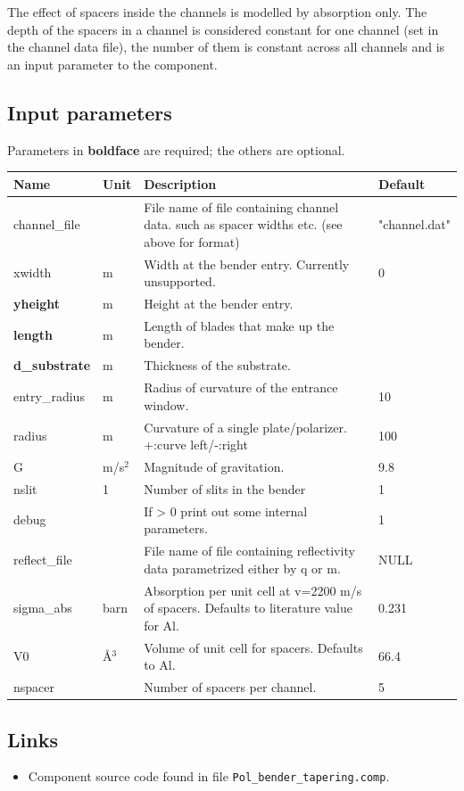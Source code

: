 The effect of spacers inside the channels is modelled by absorption only. The depth of the spacers in a channel is considered constant for one channel (set in the channel data file), the number of them is constant across all channels and is an input parameter to the component.

\subsection*{Input parameters}
Parameters in \textbf{boldface} are required; the others are optional.

\begin{longtable}{p{}p{}p{}p{}}
\toprule
\textbf{Name} & \textbf{Unit} & \textbf{Description} & \textbf{Default} \\
\midrule
\endhead
channel\_file &   & File name of file containing channel data. such as spacer widths etc. (see above for format) & "channel.dat" \\
xwidth & m & Width at the bender entry. Currently unsupported. & 0 \\
\textbf{yheight} & m & Height at the bender entry. &  \\
\textbf{length} & m & Length of blades that make up the bender. &  \\
\textbf{d\_substrate} & m & Thickness of the substrate. &  \\
entry\_radius & m & Radius of curvature of the entrance window. & 10 \\
radius & m & Curvature of a single plate/polarizer. +:curve left/-:right & 100 \\
G & m/s$^{2}$ & Magnitude of gravitation. & 9.8 \\
nslit & 1 & Number of slits in the bender & 1 \\
debug &   & If \textgreater{} 0 print out some internal parameters. & 1 \\
reflect\_file &   & File name of file containing reflectivity data parametrized either by q or m. & NULL \\
sigma\_abs & barn & Absorption per unit cell at v=2200 m/s of spacers. Defaults to literature value for Al. & 0.231 \\
V0 & \AA{}$^{3}$ & Volume of unit cell for spacers. Defaults to Al. & 66.4 \\
nspacer &   & Number of spacers per channel. & 5 \\
\bottomrule
\end{longtable}

\subsection*{Links}
\begin{itemize}
  \item Component source code found in file \texttt{Pol\_bender\_tapering.comp}.
\end{itemize}
